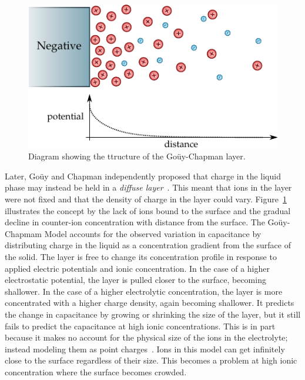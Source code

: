     \begin{figure}
      \begin{center}
        \includegraphics{content/introduction/graphics/model_guoyChapman}
      \end{center}
      \caption{Diagram showing the ttructure of the Goüy-Chapman layer.}
      \label{fig:doubleLayerModel_gouyChapman}
    \end{figure}
    Later, Goüy and Chapman independently proposed that charge in the liquid phase may instead be held in a \emph{diffuse layer}~\cite{Chapman1913}.
    This meant that ions in the layer were not fixed and that the density of charge in the layer could vary.
    Figure~\ref{fig:doubleLayerModel_gouyChapman} illustrates the concept by the lack of ions bound to the surface and the gradual decline in counter-ion concentration with distance from the surface.
    The Goüy-Chapmam Model accounts for the observed variation in capacitance by distributing charge in the liquid as a concentration gradient from the surface of the solid.
    The layer is free to change its concentration profile in response to applied electric potentials and ionic concentration.
    In the case of a higher electrostatic potential, the layer is pulled closer to the surface, becoming shallower.
    In the case of a higher electrolytic concentration, the layer is more concentrated with a higher charge density, again becoming shallower.
    It predicts the change in capacitance by growing or shrinking the size of the layer, but it still fails to predict the capacitance at high ionic concentrations.
    This is in part because it makes no account for the physical size of the ions in the electrolyte; instead modeling them as point charges~\cite{Bard1980}.
    Ions in this model can get infinitely close to the surface regardless of their size.
    This becomes a problem at high ionic concentration where the surface becomes crowded.

